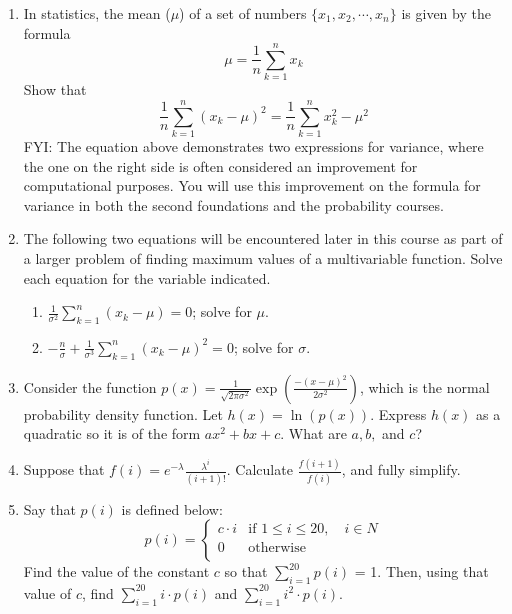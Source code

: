 \documentclass{article}
\begin{document}
\begin{enumerate}
                    \item In statistics, the mean ($\mu$) of a set of numbers $\{x_1, x_2, \cdots, x_n\}$ is given by the formula $$\mu = \frac{1}{n}\sum_{k=1}^n x_k$$  Show that $$\frac{1}{n}\sum_{k=1}^n (x_k-\mu)^2 = \frac{1}{n}\sum_{k=1}^n x_k^2-\mu^2$$  FYI: The equation above demonstrates two expressions for variance, where the one on the right side is often considered an improvement for computational purposes.  You will use this improvement on the formula for variance in both the second foundations and the probability courses.
                    \item The following two equations will be encountered later in this course as part of a larger problem of finding maximum values of a multivariable function.  Solve each equation for the variable indicated. 
                       \begin{enumerate}
                           \item $\displaystyle \frac{1}{\sigma^2}\sum_{k=1}^{n}(x_k-\mu)=0$; solve for $\mu$.
                           \item $\displaystyle -\frac{n}{\sigma}+\frac{1}{\sigma^3}\sum_{k=1}^{n}(x_k-\mu)^2=0$; solve for $\sigma$.
                       \end{enumerate} 
                    \item Consider the function $\displaystyle p(x) = \frac{1}{\sqrt{2\pi \sigma^2}}\exp\left( \frac{-(x-\mu)^2}{2\sigma^2}\right)$, which is the normal probability density function.  Let $h(x) = \ln(p(x))$.  Express $h(x)$ as a quadratic so it is of the form $ax^2+bx+c$. What are $a,b,$ and $c$? 
                    \item Suppose that $\displaystyle f(i)= e^{-\lambda}\frac{\lambda^i}{(i+1)!}$.  Calculate $\displaystyle \frac{f(i+1)}{f(i)}$, and fully simplify.
                    \item Say that $p(i)$ is defined below:
                        $$ p(i) = \begin{cases} 
                        c\cdot i & \text{if $1 
                        \leq i \leq 20, \quad i \in N$} \\
                        0 & \text{otherwise} \\
                        \end{cases}
                        $$
                        Find the value of the constant $c$ so that $\displaystyle \sum_{i=1}^{20} p(i)$ = 1. Then, using that value of $c$, find $\displaystyle \sum_{i=1}^{20} i\cdot p(i)$ and $\displaystyle \sum_{i=1}^{20} i^2 \cdot p(i)$. 

\end{enumerate}
\end{document}
